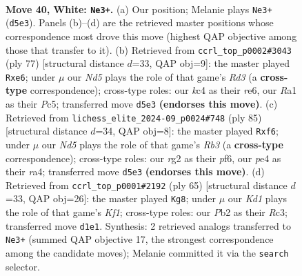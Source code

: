 \documentclass[11pt]{article}
\begin{document}
\clearpage

\begin{figure}[p]\centering
\begin{subfigure}{0.46\textwidth}\centering
\resizebox{\linewidth}{!}{%
\newchessgame
\chessboard[
  setfen={8/pR6/8/2pN1p1P/2k1p3/8/1P4rr/R2K4 w - - 1 40},
  showmover=false,
  pgfstyle=straightmove, color=movearrow, markmove={d5-e3}
]}
\caption{}
\end{subfigure}\hfill
\begin{subfigure}{0.46\textwidth}\centering
\resizebox{\linewidth}{!}{%
\newchessgame
\chessboard[
  setfen={8/8/1k1rRp2/1Pp2P1r/p7/8/PPK2R2/8 b - - 2 39},
  showmover=false,
  pgfstyle=straightmove, color=movearrow, markmove={d6-e6}
]}
\caption{}
\end{subfigure}
\\[4pt]
\begin{subfigure}{0.46\textwidth}\centering
\resizebox{\linewidth}{!}{%
\newchessgame
\chessboard[
  setfen={2r3k1/5p2/1r3P2/3Rp3/R1P3P1/3K4/8/8 b - - 1 43},
  showmover=false,
  pgfstyle=straightmove, color=movearrow, markmove={b6-f6}
]}
\caption{}
\end{subfigure}\hfill
\begin{subfigure}{0.46\textwidth}\centering
\resizebox{\linewidth}{!}{%
\newchessgame
\chessboard[
  setfen={5k2/pR5R/6p1/6P1/7P/2r5/Pn3r2/1K6 b - - 5 33},
  showmover=false,
  pgfstyle=straightmove, color=movearrow, markmove={f8-g8}
]}
\caption{}
\end{subfigure}
\caption{\textbf{Move 40, White: \texttt{Ne3+}.} (a) Our position; Melanie plays \texttt{Ne3+} (\texttt{d5e3}). Panels (b)--(d) are the retrieved master positions whose correspondence most drove this move (highest QAP objective among those that transfer to it). (b) Retrieved from \texttt{ccrl\_top\_p0002\#3043} (ply 77) [structural distance $d$=33, QAP obj=9]: the master played \texttt{Rxe6}; under $\mu$ our \emph{Nd5} plays the role of that game's \emph{Rd3} (a \textbf{cross-type} correspondence); cross-type roles: our \emph{k}c4 as their \emph{r}e6, our \emph{R}a1 as their \emph{P}c5; transferred move \texttt{d5e3} \textbf{(endorses this move)}. (c) Retrieved from \texttt{lichess\_elite\_2024-09\_p0024\#748} (ply 85) [structural distance $d$=34, QAP obj=8]: the master played \texttt{Rxf6}; under $\mu$ our \emph{Nd5} plays the role of that game's \emph{Rb3} (a \textbf{cross-type} correspondence); cross-type roles: our \emph{r}g2 as their \emph{p}f6, our \emph{p}e4 as their \emph{r}a4; transferred move \texttt{d5e3} \textbf{(endorses this move)}. (d) Retrieved from \texttt{ccrl\_top\_p0001\#2192} (ply 65) [structural distance $d$=33, QAP obj=26]: the master played \texttt{Kg8}; under $\mu$ our \emph{Kd1} plays the role of that game's \emph{Kf1}; cross-type roles: our \emph{P}b2 as their \emph{R}c3; transferred move \texttt{d1e1}. Synthesis: 2 retrieved analogs transferred to \texttt{Ne3+} (summed QAP objective 17, the strongest correspondence among the candidate moves); Melanie committed it via the \texttt{search} selector.}
\label{fig:thought-m78}
\end{figure}
\end{document}
